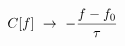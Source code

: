 \documentclass[preview]{standalone}
\begin{document}
\begin{align*}
\special{dvisvgm:raw <g id='unique000'>}C[f]\ \to\ -\frac{f-f_0}{\tau}\special{dvisvgm:raw </g>}
\end{align*}
\end{document}
